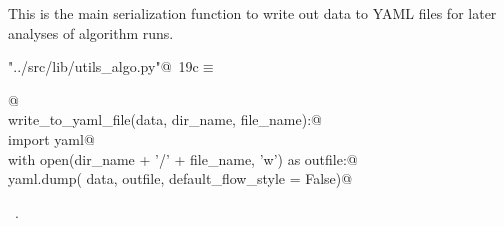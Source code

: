 \documentclass[11.5pt]{report}
\begin{document}
\newchunk This is the main serialization function to write out data to YAML files for later analyses of algorithm 
runs. 
\begin{flushleft} \small\label{scrap22}\raggedright\small
{} \verb@"../src/lib/utils_algo.py"@\nobreak\ {\footnotesize {19c}}$\equiv$
\vspace{-1ex}
\begin{list}{}{} \item
\mbox{}\verb@    @\\
\mbox{}\verb@def write_to_yaml_file(data, dir_name, file_name):@\\
\mbox{}\verb@   import yaml@\\
\mbox{}\verb@   with open(dir_name + '/' + file_name, 'w') as outfile:@\\
\mbox{}\verb@     yaml.dump( data, outfile, default_flow_style = False)@\\
\mbox{}\verb@@{\NWsep}
\end{list}
\vspace{-1.5ex}
\footnotesize
\begin{list}{}{\setlength{\itemsep}{-\parsep}\setlength{\itemindent}{-\leftmargin}}
\item \NWtxtFileDefBy\ .

\item{}
\end{list}
\vspace{4ex}
\end{flushleft}
\end{document}
